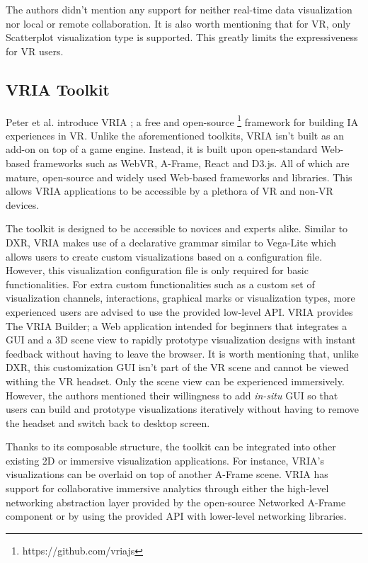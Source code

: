 \documentclass{vgtc}                          %
\begin{document}
\noindent The authors didn't mention any support for neither real-time data
visualization nor local or remote collaboration. It is also worth mentioning
that for VR, only Scatterplot visualization type is supported. This greatly
limits the expressiveness for VR users.

\subsection{VRIA Toolkit}
Peter et al. introduce VRIA \cite{vria_framework}; a free and open-source \footnote{https://github.com/vriajs}
framework for building IA experiences in VR. Unlike the aforementioned
toolkits, VRIA isn't built as an add-on on top of a game engine. Instead, it is
built upon open-standard Web-based frameworks such as WebVR, A-Frame, React and
D3.js. All of which are mature, open-source and widely used Web-based
frameworks and libraries. This allows VRIA applications to be accessible by a
plethora of VR and non-VR devices.

\smallskip

\noindent The toolkit is designed to be accessible to novices and experts
alike. Similar to DXR, VRIA makes use of a declarative grammar similar to
Vega-Lite \cite{vega_lite} which allows users to create custom visualizations based on a configuration
file. However, this visualization configuration file is only required for
basic functionalities. For extra custom functionalities such as a custom set of
visualization channels, interactions, graphical marks or visualization types,
more experienced users are advised to use the provided low-level API.
VRIA provides The VRIA Builder; a Web application intended for beginners that
integrates a GUI and a 3D scene view to rapidly prototype visualization designs
with instant feedback without having to leave the browser. It is worth
mentioning that, unlike DXR, this customization GUI isn't part of the VR scene
and cannot be viewed withing the VR headset. Only the scene view can be
experienced immersively. However, the authors mentioned their willingness to
add \textit{in-situ} GUI so that users can build and prototype visualizations
iteratively without having to remove the headset and switch back to desktop
screen.

\smallskip

\noindent Thanks to its composable structure, the toolkit can be integrated into
other existing 2D or immersive visualization applications. For instance,
VRIA's visualizations can be overlaid on top of another A-Frame scene.
VRIA has support for collaborative immersive analytics through either the
high-level networking abstraction layer provided by the open-source Networked
A-Frame component or by using the provided API with lower-level networking
libraries.
\end{document}
